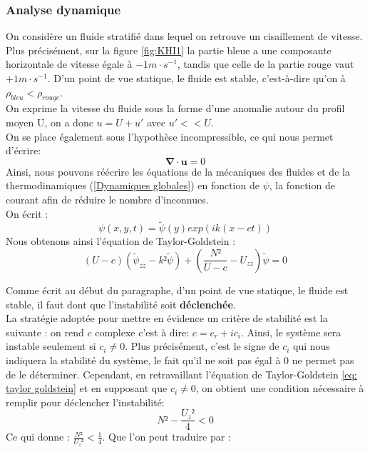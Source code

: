 \documentclass{rapportECC}
\begin{document}
\subsubsection{Analyse dynamique}

On considère un fluide stratifié dans lequel on retrouve un cisaillement de vitesse. Plus précisément, sur la figure \ref{fig:KHI1} la partie bleue a une composante horizontale de vitesse égale à $-1 m \cdot s^{-1}$, tandis que celle de la partie rouge vaut $+1 m \cdot s^{-1}$. D'un point de vue statique, le fluide est stable, c'est-à-dire qu'on à $\rho_{bleu} < \rho_{rouge}$. \\
On exprime la vitesse du fluide sous la forme d'une anomalie autour du profil moyen U, on a donc $u = U+u'$ avec $u'<<U$. \\
On se place également sous l'hypothèse incompressible, ce qui nous permet d'écrire: 
\begin{equation}
    \mathbf{\nabla} \cdot \mathbf{u} = 0
\end{equation}
Ainsi, nous pouvons réécrire les équations de la mécaniques des fluides et de la thermodinamiques (\ref{Dynamiques globales}) en fonction de $\psi$, la fonction de courant afin de réduire le nombre d'inconnues.
\\
On écrit :
\begin{equation}
    \psi(x,y,t) = \tilde{\psi}(y)exp(ik(x-ct))
    \label{eq: fct courant}
\end{equation}
Nous obtenons ainsi l'équation de Taylor-Goldstein : \\
\begin{equation}
    (U - c)(\tilde{\psi}_{zz} - k²\tilde{\psi}) + (\frac{N²}{U - c} - U_{zz})\tilde{\psi} = 0
    \label{eq: taylor goldstein}
\end{equation}

Comme écrit au début du paragraphe, d'un point de vue statique, le fluide est stable, il faut dont que l'instabilité soit \textbf{déclenchée}. \\

La stratégie adoptée pour mettre en évidence un critère de stabilité est la suivante : on rend $c$ complexe c'est à dire: $c = c_r + ic_i $. Ainsi, le système sera instable seulement si $c_i \neq 0$. Plus précisément, c'est le signe de $c_i$ qui nous indiquera la stabilité du système, le fait qu'il ne soit pas égal à 0 ne permet pas de le déterminer. Cependant, en retravaillant l'équation de Taylor-Goldstein \eqref{eq: taylor goldstein} et en supposant que $c_i \neq 0$, on obtient une condition nécessaire à remplir pour déclencher l'instabilité:
\begin{equation}
    N² - \frac{U_{z}²}{4} < 0
\end{equation}
Ce qui donne : $\frac{N²}{U_{z}²} < \frac{1}{4}$. 
Que l'on peut traduire par :
\end{document}

